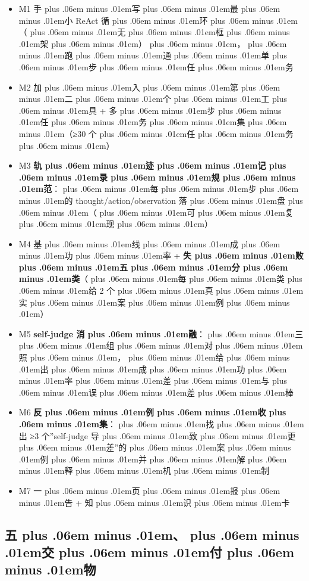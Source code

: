\documentclass[
]{article}
\providecommand{\tightlist}{%
  \setlength{\itemsep}{0pt}\setlength{\parskip}{0pt}}
\def\zh#1{{\zhfont #1}}
\def\sym#1{{\symfont #1}}
\def\zhglue{\hskip0pt plus .06em minus .01em}
\begin{document}
\begin{itemize}
\tightlist
\item[$\square$]
  M1 \zh{手\zhglue 写\zhglue 最\zhglue 小} ReAct \zh{循\zhglue 环\zhglue （\zhglue 无\zhglue 框\zhglue 架\zhglue ）\zhglue ，\zhglue 跑\zhglue 通\zhglue 单\zhglue 步\zhglue 任\zhglue 务}
\item[$\square$]
  M2 \zh{加\zhglue 入\zhglue 第\zhglue 二\zhglue 个\zhglue 工\zhglue 具} + \zh{多\zhglue 步\zhglue 任\zhglue 务\zhglue 集\zhglue （}\sym{≥}30 \zh{个\zhglue 任\zhglue 务\zhglue ）}
\item[$\square$]
  M3 \textbf{\zh{轨\zhglue 迹\zhglue 记\zhglue 录\zhglue 规\zhglue 范}}\zh{：\zhglue 每\zhglue 步\zhglue 的} thought/action/observation \zh{落\zhglue 盘\zhglue （\zhglue 可\zhglue 复\zhglue 现\zhglue ）}
\item[$\square$]
  M4 \zh{基\zhglue 线\zhglue 成\zhglue 功\zhglue 率} + \textbf{\zh{失\zhglue 败\zhglue 五\zhglue 分\zhglue 类}}\zh{（\zhglue 每\zhglue 类\zhglue 给} 2 \zh{个\zhglue 真\zhglue 实\zhglue 案\zhglue 例\zhglue ）}
\item[$\square$]
  M5 \textbf{self-judge \zh{消\zhglue 融}}\zh{：\zhglue 三\zhglue 组\zhglue 对\zhglue 照\zhglue ，\zhglue 给\zhglue 出\zhglue 成\zhglue 功\zhglue 率\zhglue 差\zhglue 与\zhglue 误\zhglue 差\zhglue 棒}
\item[$\square$]
  M6 \textbf{\zh{反\zhglue 例\zhglue 收\zhglue 集}}\zh{：\zhglue 找\zhglue 出} \sym{≥}3 \zh{个}''self-judge \zh{导\zhglue 致\zhglue 更\zhglue 差}''\zh{的\zhglue 案\zhglue 例\zhglue 并\zhglue 解\zhglue 释\zhglue 机\zhglue 制}
\item[$\square$]
  M7 \zh{一\zhglue 页\zhglue 报\zhglue 告} + \zh{知\zhglue 识\zhglue 卡}
\end{itemize}

\subsection{\zh{五\zhglue 、\zhglue 交\zhglue 付\zhglue 物}}\label{ux4e94ux4ea4ux4ed8ux7269-8}
\end{document}
